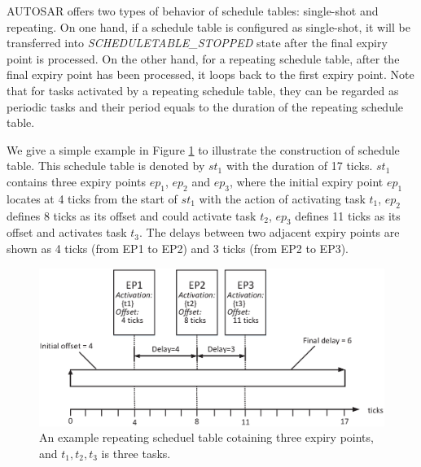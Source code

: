 \documentclass[sigconf]{acmart}
\begin{document}

AUTOSAR offers two types of behavior of schedule tables: single-shot and repeating. On one hand, if a schedule table is configured as single-shot, it will be transferred into \emph{SCHEDULETABLE\_STOPPED} state after the final expiry point is processed. On the other hand, for a repeating schedule table, after the final expiry point has been processed, it loops back to the first expiry point. Note that for tasks activated by a repeating schedule table, they can be regarded as periodic tasks and their period equals to the duration of the repeating schedule table.

We give a simple example in Figure \ref{figure_st1} to illustrate the construction of schedule table. This schedule table is denoted by $st_1$ with the duration of 17 ticks. $st_1$ contains three expiry points $ep_1$, $ep_2$ and $ep_3$, where the initial expiry point $ep_1$ locates at 4 ticks from the start of $st_1$ with the action of activating task $t_1$, $ep_2$ defines 8 ticks as its offset and could activate task $t_2$, $ep_3$ defines 11 ticks as its offset and activates task $t_3$. The delays between two adjacent expiry points are shown as 4 ticks (from EP1 to EP2) and 3 ticks (from EP2 to EP3).
\begin{figure}[t]
  \centering
  \includegraphics[scale=.32]{graphics/figure_st1.eps}
  \caption{An example repeating scheduel table cotaining three expiry points, and $t_1,t_2,t_3$ is three tasks.}
  \label{figure_st1}
\end{figure}
\end{document}
